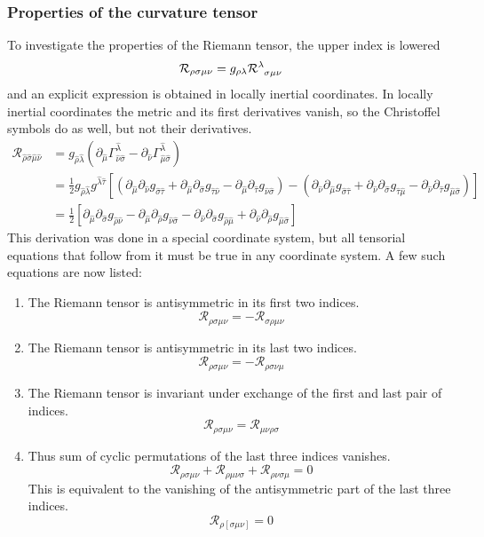 \subsubsection{Properties of the curvature tensor}
To investigate the properties of the Riemann tensor, the upper index is lowered
\[ \mathcal{R}_{\rho\sigma\mu\nu} = g_{\rho\lambda}\tensor{\mathcal{R}}{^\lambda_{\sigma\mu\nu}} \]
and an explicit expression is obtained in locally inertial coordinates. In locally inertial coordinates the metric and its first derivatives vanish, so the Christoffel symbols do as well, but not their derivatives.
\begin{align}
\mathcal{R}_{\hat{\rho}\hat{\sigma}\hat{\mu}\hat{\nu}} &= g_{\hat{\rho}\hat{\lambda}} \left(\partial_{\hat{\mu}}\Gamma^{\hat{\lambda}}_{\hat{\nu}\hat{\sigma}} - \partial_{\hat{\nu}}\Gamma^{\hat{\lambda}}_{\hat{\mu}\hat{\sigma}}\right) \\
&= \frac{1}{2}g_{\hat{\rho}\hat{\lambda}}g^{\hat{\lambda}\hat{\tau}}\left[\left(\partial_{\hat{\mu}}\partial_{\hat{\nu}}g_{\hat{\sigma}\hat{\tau}} + \partial_{\hat{\mu}}\partial_{\hat{\sigma}}g_{\hat{\tau}\hat{\nu}} - \partial_{\hat{\mu}}\partial_{\hat{\tau}}g_{\hat{\nu}\hat{\sigma}}\right) - \left(\partial_{\hat{\nu}}\partial_{\hat{\mu}}g_{\hat{\sigma}\hat{\tau}} + \partial_{\hat{\nu}}\partial_{\hat{\sigma}}g_{\hat{\tau}\hat{\mu}} - \partial_{\hat{\nu}}\partial_{\hat{\tau}}g_{\hat{\mu}\hat{\sigma}}\right)\right] \\
&= \frac{1}{2}\left[\partial_{\hat{\mu}}\partial_{\hat{\sigma}}g_{\hat{\rho}\hat{\nu}} - \partial_{\hat{\mu}}\partial_{\hat{\rho}}g_{\hat{\nu}\hat{\sigma}} - \partial_{\hat{\nu}}\partial_{\hat{\sigma}}g_{\hat{\rho}\hat{\mu}} + \partial_{\hat{\nu}}\partial_{\hat{\rho}}g_{\hat{\mu}\hat{\sigma}}\right]
\end{align}
This derivation was done in a special coordinate system, but all tensorial equations that follow from it must be true in any coordinate system. A few such equations are now listed:
\begin{enumerate}
\item The Riemann tensor is antisymmetric in its first two indices.
\[ \boxed{ \mathcal{R}_{\rho\sigma\mu\nu} = - \mathcal{R}_{\sigma\rho\mu\nu} } \]
\item The Riemann tensor is antisymmetric in its last two indices.
\[ \boxed{ \mathcal{R}_{\rho\sigma\mu\nu} = - \mathcal{R}_{\rho\sigma\nu\mu} } \]
\item The Riemann tensor is invariant under exchange of the first and last pair of indices.
\[ \boxed{ \mathcal{R}_{\rho\sigma\mu\nu} = \mathcal{R}_{\mu\nu\rho\sigma} } \]
\item Thus sum of cyclic permutations of the last three indices vanishes.
\[ \mathcal{R}_{\rho\sigma\mu\nu} + \mathcal{R}_{\rho\mu\nu\sigma} + \mathcal{R}_{\rho\nu\sigma\mu} = 0 \]
This is equivalent to the vanishing of the antisymmetric part of the last three indices.
\[ \boxed{  \mathcal{R}_{\rho[\sigma\mu\nu]} = 0 } \]
\end{enumerate}

